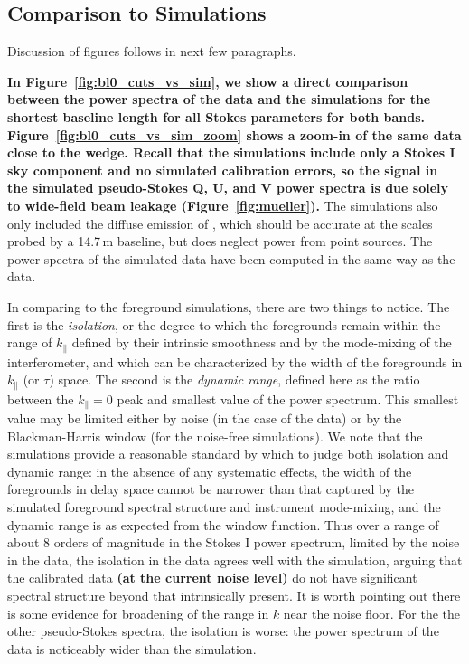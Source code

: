 \documentclass[twocolumn, trackchanges]{aastex61}
\newcommand{\edited}[1]{{\bf \color{blue} #1}}
\begin{document}
\subsection{Comparison to Simulations}

{\color{red} Discussion of figures follows in next few paragraphs.}

\edited{In Figure~\ref{fig:bl0_cuts_vs_sim}, we show a direct comparison between
  the power spectra of the data and the simulations for the shortest baseline
  length for all Stokes parameters for both
  bands. Figure~\ref{fig:bl0_cuts_vs_sim_zoom} shows a zoom-in of the same data
  close to the wedge. Recall that the simulations include only a Stokes I sky
  component and no simulated calibration errors, so the signal in the simulated
  pseudo-Stokes Q, U, and V power spectra is due solely to wide-field beam
  leakage (Figure~\ref{fig:mueller}).}  The simulations also only included the
diffuse emission of \citep[the most recent version of the GSM;][]{GSM.17}, which
should be accurate at the scales probed by a 14.7\,m baseline, but does neglect
power from point sources.  The power spectra of the simulated data have been
computed in the same way as the data.

In comparing to the foreground simulations, there are two things to notice.  The
first is the {\it isolation}, or the degree to which the foregrounds remain
within the range of $k_\parallel$ defined by their intrinsic smoothness and by
the mode-mixing of the interferometer, and which can be characterized by the
width of the foregrounds in $k_\parallel$ (or $\tau$) space.  The second is the
{\it dynamic range}, defined here as the ratio between the $k_\parallel=0$ peak
and smallest value of the power spectrum.  This smallest value may be limited
either by noise (in the case of the data) or by the Blackman-Harris window (for
the noise-free simulations).  We note that the simulations provide a reasonable
standard by which to judge both isolation and dynamic range: in the absence of
any systematic effects, the width of the foregrounds in delay space cannot be
narrower than that captured by the simulated foreground spectral structure and
instrument mode-mixing, and the dynamic range is as expected from the window
function.  Thus over a range of about 8 orders of magnitude in the Stokes I
power spectrum, limited by the noise in the data, the isolation in the data
agrees well with the simulation, arguing that the calibrated data \edited{(at
  the current noise level)} do not have significant spectral structure beyond
that intrinsically present.  It is worth pointing out there is some evidence for
broadening of the range in $k$ near the noise floor.  For the the other
pseudo-Stokes spectra, the isolation is worse: the power spectrum of the data is
noticeably wider than the simulation.
\end{document}
